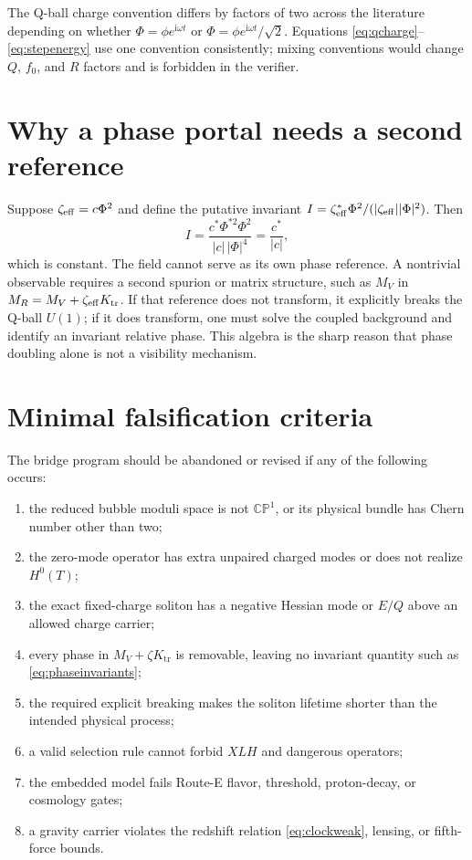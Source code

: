 \documentclass[11pt]{article}
\numberwithin{equation}{section}
\newcommand{\CP}{\mathbb{CP}}
\newcommand{\Ktr}{K_{\mathrm{tr}}}
\newcommand{\ii}{\mathrm i}
\begin{document}
The Q-ball charge convention differs by factors of two across the literature
depending on whether \(\Phi=\phi e^{\ii\omega t}\) or
\(\Phi=\phi e^{\ii\omega t}/\sqrt2\).  Equations
\eqref{eq:qcharge}--\eqref{eq:stepenergy} use one convention consistently;
mixing conventions would change \(Q\), \(f_0\), and \(R\) factors and is
forbidden in the verifier.

\section{Why a phase portal needs a second reference}

Suppose \(\zeta_{\rm eff}=c\Phi^2\) and define the putative invariant
\(I=\zeta_{\rm eff}^*\Phi^2/(|\zeta_{\rm eff}||\Phi|^2)\).  Then
\begin{equation}
 I=\frac{c^*\Phi^{*2}\Phi^2}{|c|\,|\Phi|^4}=\frac{c^*}{|c|},
\end{equation}
which is constant.  The field cannot serve as its own phase reference.  A
nontrivial observable requires a second spurion or matrix structure, such as
\(M_V\) in \(M_R=M_V+\zeta_{\rm eff}\Ktr\).  If that reference does not
transform, it explicitly breaks the Q-ball \(U(1)\); if it does transform, one
must solve the coupled background and identify an invariant relative phase.
This algebra is the sharp reason that phase doubling alone is not a visibility
mechanism.

\section{Minimal falsification criteria}

The bridge program should be abandoned or revised if any of the following
occurs:
\begin{enumerate}
\item the reduced bubble moduli space is not \(\CP^1\), or its physical bundle
has Chern number other than two;
\item the zero-mode operator has extra unpaired charged modes or does not
realize \(H^0(T)\);
\item the exact fixed-charge soliton has a negative Hessian mode or
\(E/Q\) above an allowed charge carrier;
\item every phase in \(M_V+\zeta\Ktr\) is removable, leaving no invariant
quantity such as \eqref{eq:phaseinvariants};
\item the required explicit breaking makes the soliton lifetime shorter than
the intended physical process;
\item a valid selection rule cannot forbid \(XLH\) and dangerous operators;
\item the embedded model fails Route-E flavor, threshold, proton-decay, or
cosmology gates;
\item a gravity carrier violates the redshift relation \eqref{eq:clockweak},
lensing, or fifth-force bounds.
\end{enumerate}



\end{document}
